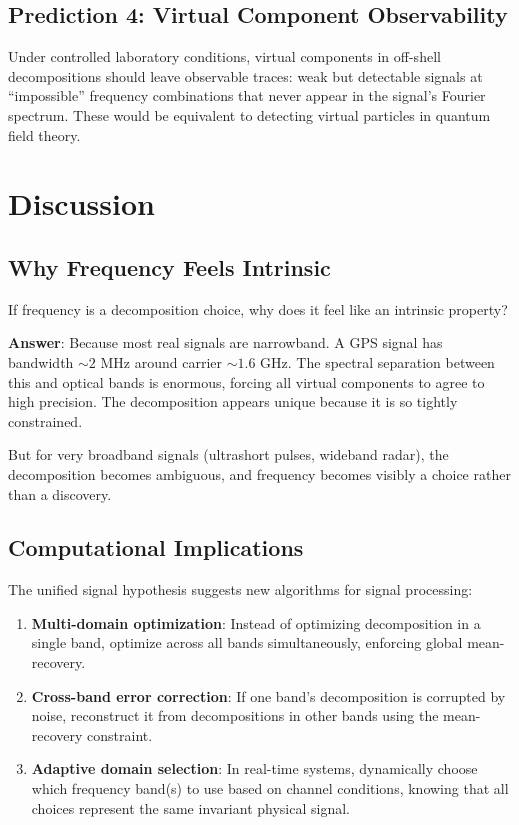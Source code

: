 \documentclass[twocolumn,11pt,a4paper]{article}
\begin{document}
\subsection{Prediction 4: Virtual Component Observability}

Under controlled laboratory conditions, virtual components in off-shell decompositions should leave observable traces: weak but detectable signals at ``impossible'' frequency combinations that never appear in the signal's Fourier spectrum. These would be equivalent to detecting virtual particles in quantum field theory.

\section{Discussion}
\label{sec:discussion}

\subsection{Why Frequency Feels Intrinsic}

If frequency is a decomposition choice, why does it feel like an intrinsic property?

\textbf{Answer}: Because most real signals are narrowband. A GPS signal has bandwidth $\sim 2$ MHz around carrier $\sim 1.6$ GHz. The spectral separation between this and optical bands is enormous, forcing all virtual components to agree to high precision. The decomposition appears unique because it is so tightly constrained.

But for very broadband signals (ultrashort pulses, wideband radar), the decomposition becomes ambiguous, and frequency becomes visibly a choice rather than a discovery.

\subsection{Computational Implications}

The unified signal hypothesis suggests new algorithms for signal processing:

\begin{enumerate}[nosep]
  \item \textbf{Multi-domain optimization}: Instead of optimizing decomposition in a single band, optimize across all bands simultaneously, enforcing global mean-recovery.

  \item \textbf{Cross-band error correction}: If one band's decomposition is corrupted by noise, reconstruct it from decompositions in other bands using the mean-recovery constraint.

  \item \textbf{Adaptive domain selection}: In real-time systems, dynamically choose which frequency band(s) to use based on channel conditions, knowing that all choices represent the same invariant physical signal.
\end{enumerate}
\end{document}
